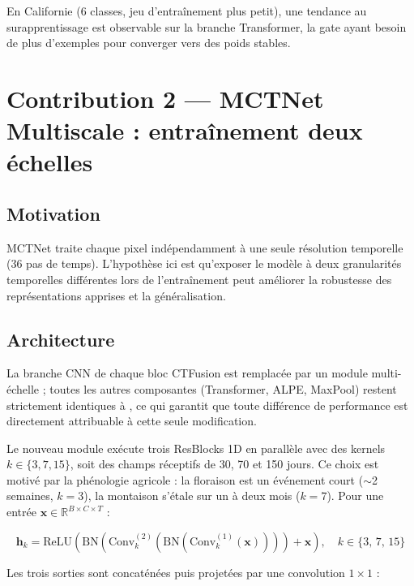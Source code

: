 En Californie (6 classes, jeu d'entraînement plus petit), une tendance au
surapprentissage est observable sur la branche Transformer, la gate ayant
besoin de plus d'exemples pour converger vers des poids stables.

\section{Contribution 2 — MCTNet Multiscale : entraînement deux échelles}
\label{sec:multiscale}

\subsection{Motivation}

MCTNet traite chaque pixel indépendamment à une seule résolution temporelle
(36 pas de temps). L'hypothèse ici est qu'exposer le modèle à deux granularités
temporelles différentes lors de l'entraînement peut améliorer la robustesse
des représentations apprises et la généralisation.

\subsection{Architecture}
\label{subsec:ms_archi}

La branche CNN de chaque bloc CTFusion est remplacée par un module
multi-échelle ; toutes les autres composantes (Transformer, ALPE, MaxPool)
restent strictement identiques à \cite{wang2024}, ce qui garantit que toute
différence de performance est directement attribuable à cette seule modification.

Le nouveau module exécute trois ResBlocks 1D en parallèle avec des kernels
$k \in \{3, 7, 15\}$, soit des champs réceptifs de 30, 70 et 150 jours.
Ce choix est motivé par la phénologie agricole : la floraison est un événement
court ($\sim$2 semaines, $k{=}3$), la montaison s'étale sur un à deux mois
($k{=}7$).
Pour une entrée $\mathbf{x} \in \mathbb{R}^{B \times C \times T}$ :

\begin{equation}
  \mathbf{h}_k = \text{ReLU}\!\left(
    \text{BN}\!\left(\text{Conv}^{(2)}_k\!\left(
      \text{BN}\!\left(\text{Conv}^{(1)}_k(\mathbf{x})\right)
    \right)\right) + \mathbf{x}
  \right), \quad k \in \{3,\,7,\,15\}
\end{equation}

Les trois sorties sont concaténées puis projetées par une convolution $1{\times}1$ :

